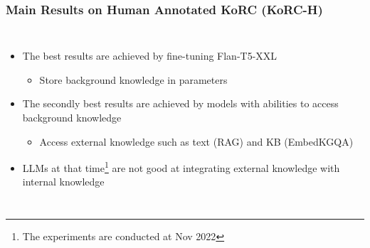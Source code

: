 \documentclass{beamer}
\begin{document}
\begin{frame}
\frametitle{Main Results on Human Annotated KoRC (KoRC-H)}

\begin{columns}
    \begin{itemize}
        \item The best results are achieved by fine-tuning Flan-T5-XXL
        \begin{itemize}
            \item Store background knowledge in parameters
        \end{itemize}
        \item The secondly best results are achieved by models with abilities to access background knowledge
        \begin{itemize}
            \item Access external knowledge such as text (RAG) and KB (EmbedKGQA)
        \end{itemize}
        \item LLMs at that time\footnote{The experiments are conducted at Nov 2022} are not good at integrating external knowledge with internal knowledge
    \end{itemize}
    
\end{columns}
\end{frame}
\end{document}
